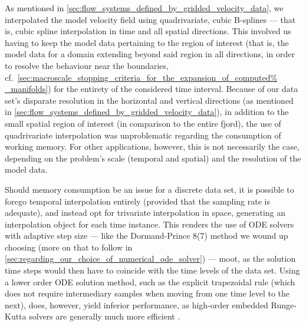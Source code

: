 As mentioned in \cref{sec:flow_systems_defined_by_gridded_velocity_data}, we
interpolated the model velocity field using quadrivariate, cubic B-splines ---
that is, cubic spline interpolation in time and all spatial directions. This
involved us having to keep the model data pertaining to the region of interest
(that is, the model data for a domain extending beyond said region in all
directions, in order to resolve the behaviour near the boundaries, cf.\
\cref{sec:macroscale_stopping_criteria_for_the_expansion_of_computed%
_manifolds}) for the entirety of the considered time interval. Because of our
data set's disparate resolution in the horizontal and vertical directions
(as mentioned in \cref{sec:flow_systems_defined_by_gridded_velocity_data}), in
addition to the small spatial region of interest (in comparison to the entire
fjord), the use of quadrivariate interpolation was unproblematic regarding
the consumption of working memory. For other applications, however, this is not
necessarily the case, depending on the problem's scale (temporal and spatial)
and the resolution of the model data.

Should memory consumption be an issue for a discrete data set, it is possible
to forego temporal interpolation entirely (provided that the sampling rate
is adequate), and instead opt for trivariate interpolation in space, generating
an interpolation object for each time instance. This renders the use of
ODE solvers with adaptive step size --- like the Dormand-Prince 8(7) method we
wound up choosing (more on that to follow in
\cref{sec:regarding_our_choice_of_numerical_ode_solver}) --- moot, as the
solution time steps would then have to coincide with the time levels of the
data set. Using a lower order ODE solution method, such as the explicit
trapezoidal rule (which does not require intermediary samples when moving from
one time level to the next), does, however, yield inferior performance, as
high-order embedded Runge-Kutta solvers are generally much more efficient
\parencite{loken2017sensitivity}.



